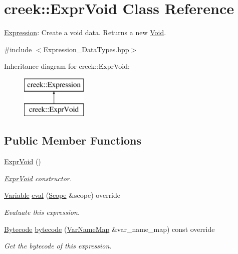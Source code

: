\hypertarget{classcreek_1_1_expr_void}{}\section{creek\+:\+:Expr\+Void Class Reference}
\label{classcreek_1_1_expr_void}


\hyperlink{classcreek_1_1_expression}{Expression}\+: Create a void data. Returns a new {\ttfamily \hyperlink{classcreek_1_1_void}{Void}}.  




{\ttfamily \#include $<$Expression\+\_\+\+Data\+Types.\+hpp$>$}

Inheritance diagram for creek\+:\+:Expr\+Void\+:\begin{figure}[H]
\begin{center}
\leavevmode
\includegraphics[height=2.000000cm]{classcreek_1_1_expr_void}
\end{center}
\end{figure}
\subsection*{Public Member Functions}
\begin{DoxyCompactItemize}
\item 
\hyperlink{classcreek_1_1_expr_void_a0be0dd0cbecf208a67b01549883bd8db}{Expr\+Void} ()\hypertarget{classcreek_1_1_expr_void_a0be0dd0cbecf208a67b01549883bd8db}{}\label{classcreek_1_1_expr_void_a0be0dd0cbecf208a67b01549883bd8db}

\begin{DoxyCompactList}\small\item\em {\ttfamily \hyperlink{classcreek_1_1_expr_void}{Expr\+Void}} constructor. \end{DoxyCompactList}\item 
\hyperlink{classcreek_1_1_variable}{Variable} \hyperlink{classcreek_1_1_expr_void_a298067bd586345ec4f7d716e9decaf5f}{eval} (\hyperlink{classcreek_1_1_scope}{Scope} \&scope) override
\begin{DoxyCompactList}\small\item\em Evaluate this expression. \end{DoxyCompactList}\item 
\hyperlink{classcreek_1_1_bytecode}{Bytecode} \hyperlink{classcreek_1_1_expr_void_afb59f5a7c39090f0bdd38b5d3b756b04}{bytecode} (\hyperlink{classcreek_1_1_var_name_map}{Var\+Name\+Map} \&var\+\_\+name\+\_\+map) const  override\hypertarget{classcreek_1_1_expr_void_afb59f5a7c39090f0bdd38b5d3b756b04}{}\label{classcreek_1_1_expr_void_afb59f5a7c39090f0bdd38b5d3b756b04}

\begin{DoxyCompactList}\small\item\em Get the bytecode of this expression. \end{DoxyCompactList}\end{DoxyCompactItemize}


